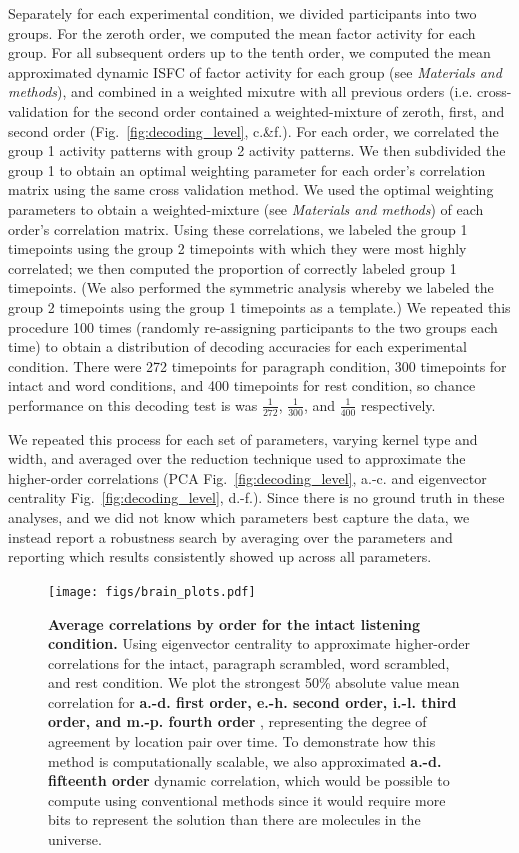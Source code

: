 \documentclass[english]{article}
\begin{document}
Separately for each experimental condition, we divided participants
into two groups. For the zeroth order, we computed the mean factor
activity for each group.  For all subsequent orders up to the tenth
order, we computed the mean approximated dynamic ISFC of factor
activity for each group (see \textit{Materials and methods}), and
combined in a weighted mixutre with all previous orders
(i.e. cross-validation for the second
order contained a weighted-mixture of zeroth, first, and second order
(Fig.~\ref{fig:decoding_level}, c.\&f.).  For
each order, we correlated the group 1 activity patterns with group 2
activity patterns.  We then subdivided the group 1 to obtain an
optimal weighting parameter for each order’s correlation matrix using
the same cross validation method. We used the optimal weighting
parameters to obtain a weighted-mixture (see \textit{Materials and methods}) of each order’s correlation
matrix. Using these correlations, we labeled the group 1 timepoints
using the group 2 timepoints with which they were most highly
correlated; we then computed the proportion of correctly labeled group
1 timepoints. (We also performed the symmetric analysis whereby we
labeled the group 2 timepoints using the group 1 timepoints as a
template.) We repeated this procedure 100 times (randomly re-assigning
participants to the two groups each time) to obtain a distribution of
decoding accuracies for each experimental condition. There were 272
timepoints for paragraph condition, 300 timepoints for intact and word
conditions, and 400 timepoints for rest condition,  so chance
performance on this decoding test is was $\frac{1}{272}$,
$\frac{1}{300}$, and $\frac{1}{400}$ respectively.
 
We repeated this process for each set of parameters, varying kernel
type and width, and averaged over the reduction technique used to
approximate the higher-order correlations (PCA Fig.~\ref{fig:decoding_level},  a.-c. and eigenvector
centrality Fig.~\ref{fig:decoding_level},  d.-f.).  Since there is no ground truth in these analyses, and we did not know
which parameters best capture the data, we instead report a robustness
search by averaging over the parameters and reporting which results
consistently showed up across all parameters.
\begin{figure}
  \centering
  \texttt{[image: figs/brain\_plots.pdf]}
  \caption{\textbf{Average correlations by order for the intact listening condition.} Using eigenvector
    centrality to approximate higher-order correlations for the
    intact, paragraph scrambled, word scrambled, and rest condition.
    We plot the
    strongest 50\% absolute value
    mean correlation for \textbf{a.-d. first order, e.-h. second order,
      i.-l. third order, and m.-p. fourth order }, representing the degree of agreement by
    location pair over time.  To demonstrate how this method is
    computationally scalable, we also approximated
    \textbf{a.-d. fifteenth order} dynamic correlation, which would be
    possible to compute using conventional methods since it would require more bits to represent the solution than there are molecules in the universe.}
  \label{fig:brain_plots}
\end{figure}
\end{document}
